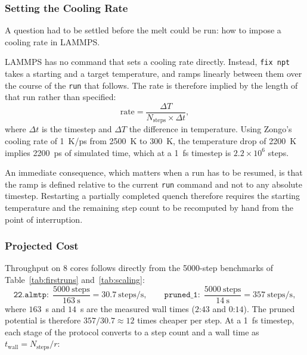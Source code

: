 \documentclass{article}
\begin{document}
\subsubsection{Setting the Cooling Rate}
A question had to be settled before the melt could be run: how to impose a cooling rate in LAMMPS.

LAMMPS has no command that sets a cooling rate directly. Instead, \texttt{fix npt} takes a starting and a target temperature, and ramps linearly between them over the course of the \texttt{run} that follows. The rate is therefore implied by the length of that run rather than specified:
\begin{equation}
    \text{rate} = \frac{\Delta T}{N_{\text{steps}} \times \Delta t},
\end{equation}
where $\Delta t$ is the timestep and $\Delta T$ the difference in temperature. Using Zongo's cooling rate of 1~K/ps from 2500~K to 300~K, the temperature drop of 2200~K implies 2200~ps of simulated time, which at a 1~fs timestep is $2.2 \times 10^6$ steps.

An immediate consequence, which matters when a run has to be resumed, is that the ramp is defined relative to the current \texttt{run} command and not to any absolute timestep. Restarting a partially completed quench therefore requires the starting temperature and the remaining step count to be recomputed by hand from the point of interruption.

\subsubsection{Projected Cost}
Throughput on 8 cores follows directly from the 5000-step benchmarks of Table~\ref{tab:firstruns} and~\ref{tab:scaling}:
\begin{equation*}
    \texttt{22.almtp}: \; \frac{5000~\text{steps}}{163~\text{s}} = 30.7~\text{steps/s},
    \qquad
    \texttt{pruned\_1}: \; \frac{5000~\text{steps}}{14~\text{s}} = 357~\text{steps/s},
\end{equation*}
where $163$~s and $14$~s are the measured wall times ($2$:$43$ and $0$:$14$). The pruned potential is therefore $357/30.7 \approx 12$ times cheaper per step. At a 1~fs timestep, each stage of the protocol converts to a step count and a wall time as $t_{\text{wall}} = N_{\text{steps}} / r$:
\end{document}
